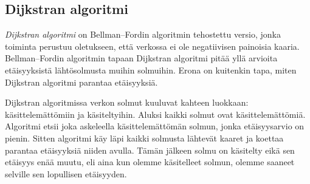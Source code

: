 \subsection{Dijkstran algoritmi}


\emph{Dijkstran algoritmi} on Bellman–Fordin algoritmin tehostettu versio,
jonka toiminta perustuu oletukseen, että verkossa ei ole
negatiivisen painoisia kaaria.
Bellman–Fordin algoritmin tapaan Dijkstran algoritmi pitää
yllä arvioita etäisyyksistä lähtösolmusta muihin solmuihin.
Erona on kuitenkin tapa, miten Dijkstran algoritmi parantaa etäisyyksiä.

Dijkstran algoritmissa verkon solmut kuuluvat kahteen luokkaan:
käsitte\-lemättömiin ja käsiteltyihin.
Aluksi kaikki solmut ovat käsittelemättömiä.
Algoritmi etsii joka askeleella käsittelemättömän solmun,
jonka etäisyys\-arvio on pienin.
Sitten algoritmi käy läpi kaikki solmusta lähtevät kaaret ja
koettaa parantaa etäisyyksiä niiden avulla.
Tämän jälkeen solmu on käsitelty eikä sen etäisyys enää muutu,
eli aina kun olemme käsitelleet solmun,
olemme saaneet selville sen lopullisen etäisyyden.

